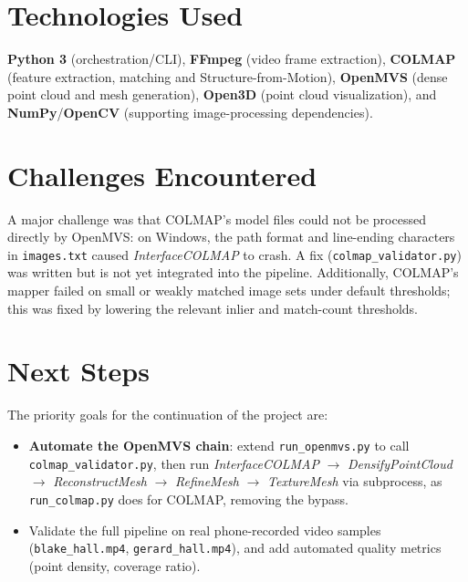 \documentclass[11pt]{article}
\begin{document}
\section{Technologies Used}
\textbf{Python 3} (orchestration/CLI), \textbf{FFmpeg} (video frame
extraction), \textbf{COLMAP} (feature extraction, matching and
Structure-from-Motion), \textbf{OpenMVS} (dense point cloud and mesh
generation), \textbf{Open3D} (point cloud visualization), and
\textbf{NumPy}/\textbf{OpenCV} (supporting image-processing dependencies).

\section{Challenges Encountered}
A major challenge was that COLMAP's model files could not be processed
directly by OpenMVS: on Windows, the path format and line-ending characters
in \texttt{images.txt} caused \textit{InterfaceCOLMAP} to crash. A fix
(\texttt{colmap\_validator.py}) was written but is not yet integrated into
the pipeline. Additionally, COLMAP's mapper failed on small or weakly matched
image sets under default thresholds; this was fixed by lowering the relevant
inlier and match-count thresholds.

\section{Next Steps}
The priority goals for the continuation of the project are:
\begin{itemize}[itemsep=1pt, topsep=2pt]
  \item \textbf{Automate the OpenMVS chain}: extend \texttt{run\_openmvs.py}
        to call \texttt{colmap\_validator.py}, then run
        \textit{InterfaceCOLMAP} $\rightarrow$ \textit{DensifyPointCloud}
        $\rightarrow$ \textit{ReconstructMesh} $\rightarrow$
        \textit{RefineMesh} $\rightarrow$ \textit{TextureMesh} via subprocess,
        as \texttt{run\_colmap.py} does for COLMAP, removing the bypass.
  \item Validate the full pipeline on real phone-recorded video samples
        (\texttt{blake\_hall.mp4}, \texttt{gerard\_hall.mp4}), and add
        automated quality metrics (point density, coverage ratio).
\end{itemize}
\end{document}
